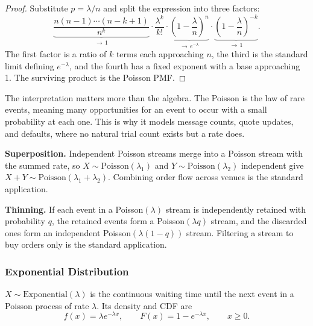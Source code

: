 \begin{proof}
Substitute $p = \lambda/n$ and split the expression into three factors:
\[
\underbrace{\frac{n(n-1)\cdots(n-k+1)}{n^k}}_{\to\, 1}
\cdot \frac{\lambda^k}{k!}
\cdot \underbrace{\left(1 - \frac{\lambda}{n}\right)^{n}}_{\to\, e^{-\lambda}}
\cdot \underbrace{\left(1 - \frac{\lambda}{n}\right)^{-k}}_{\to\, 1}.
\]
The first factor is a ratio of $k$ terms each approaching $n$, the third is the standard limit defining $e^{-\lambda}$, and the fourth has a fixed exponent with a base approaching 1. The surviving product is the Poisson PMF.
\end{proof}

The interpretation matters more than the algebra. The Poisson is the law of rare events, meaning many opportunities for an event to occur with a small probability at each one. This is why it models message counts, quote updates, and defaults, where no natural trial count exists but a rate does.

\vspace{1ex}

\begin{keybox}
\textbf{Superposition.} Independent Poisson streams merge into a Poisson stream with the summed rate, so $X \sim \text{Poisson}(\lambda_1)$ and $Y \sim \text{Poisson}(\lambda_2)$ independent give $X + Y \sim \text{Poisson}(\lambda_1 + \lambda_2)$. Combining order flow across venues is the standard application.

\vspace{2ex}

\textbf{Thinning.} If each event in a Poisson$(\lambda)$ stream is independently retained with probability $q$, the retained events form a Poisson$(\lambda q)$ stream, and the discarded ones form an independent Poisson$(\lambda(1-q))$ stream. Filtering a stream to buy orders only is the standard application.
\end{keybox}

\subsubsection{Exponential Distribution}

\begin{definition}[Exponential]
$X \sim \text{Exponential}(\lambda)$ is the continuous waiting time until the next event in a Poisson process of rate $\lambda$. Its density and CDF are
\[
f(x) = \lambda e^{-\lambda x}, \qquad F(x) = 1 - e^{-\lambda x}, \qquad x \geq 0.
\]
\end{definition}

